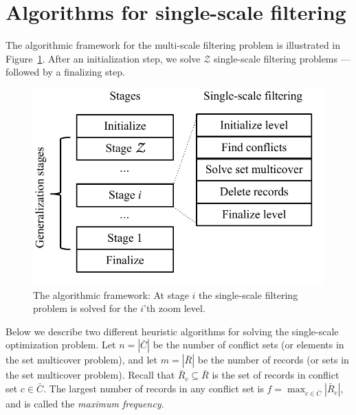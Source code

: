 \section{Algorithms for single-scale filtering}
\label{sec:algorithms}

The algorithmic framework for the multi-scale filtering problem is illustrated in Figure~\ref{fig:algorithmic-framework}. After an initialization step, we solve $\mathcal{Z}$ single-scale filtering problems --- followed by a finalizing step.


\begin{figure}[htbp]
\begin{center}
\includegraphics[scale=.6]{figs/cvl_stages.pdf}
\caption{The algorithmic framework: At stage $i$ the single-scale filtering problem is solved for the $i$'th zoom level.}
\label{fig:algorithmic-framework}
\end{center}
\end{figure}

Below we describe two different heuristic algorithms for solving the single-scale optimization problem. Let $n=|\bar{C}|$ be the number of conflict sets (or elements in the set multicover problem), and let $m=|\bar{R}|$ be the number of records (or sets in the set multicover problem). Recall that $\bar{R}_c \subseteq \bar{R}$ is the set of records in conflict set $c \in \bar{C}$. The largest number of records in any conflict set is $f = \max_{c \in \bar{C}} |\bar{R}_c|$, and is called the \emph{maximum frequency}.

